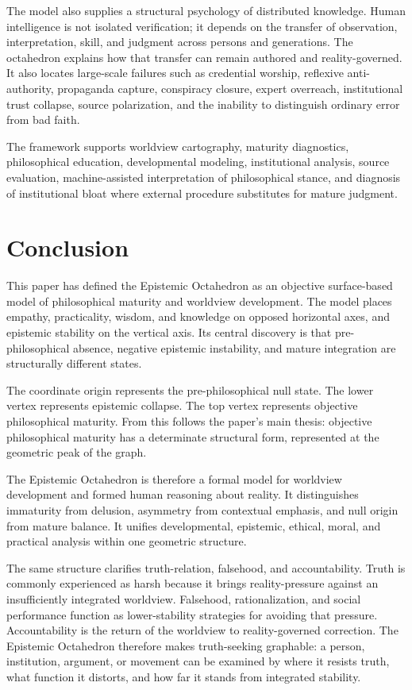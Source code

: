 \documentclass[11pt]{article}
\begin{document}
The model also supplies a structural psychology of distributed knowledge. Human intelligence is not isolated verification; it depends on the transfer of observation, interpretation, skill, and judgment across persons and generations. The octahedron explains how that transfer can remain authored and reality-governed. It also locates large-scale failures such as credential worship, reflexive anti-authority, propaganda capture, conspiracy closure, expert overreach, institutional trust collapse, source polarization, and the inability to distinguish ordinary error from bad faith.

The framework supports worldview cartography, maturity diagnostics, philosophical education, developmental modeling, institutional analysis, source evaluation, machine-assisted interpretation of philosophical stance, and diagnosis of institutional bloat where external procedure substitutes for mature judgment.

\section{Conclusion}

This paper has defined the Epistemic Octahedron as an objective surface-based model of philosophical maturity and worldview development. The model places empathy, practicality, wisdom, and knowledge on opposed horizontal axes, and epistemic stability on the vertical axis. Its central discovery is that pre-philosophical absence, negative epistemic instability, and mature integration are structurally different states.

The coordinate origin represents the pre-philosophical null state. The lower vertex represents epistemic collapse. The top vertex represents objective philosophical maturity. From this follows the paper's main thesis: objective philosophical maturity has a determinate structural form, represented at the geometric peak of the graph.

The Epistemic Octahedron is therefore a formal model for worldview development and formed human reasoning about reality. It distinguishes immaturity from delusion, asymmetry from contextual emphasis, and null origin from mature balance. It unifies developmental, epistemic, ethical, moral, and practical analysis within one geometric structure.

The same structure clarifies truth-relation, falsehood, and accountability. Truth is commonly experienced as harsh because it brings reality-pressure against an insufficiently integrated worldview. Falsehood, rationalization, and social performance function as lower-stability strategies for avoiding that pressure. Accountability is the return of the worldview to reality-governed correction. The Epistemic Octahedron therefore makes truth-seeking graphable: a person, institution, argument, or movement can be examined by where it resists truth, what function it distorts, and how far it stands from integrated stability.
\end{document}
